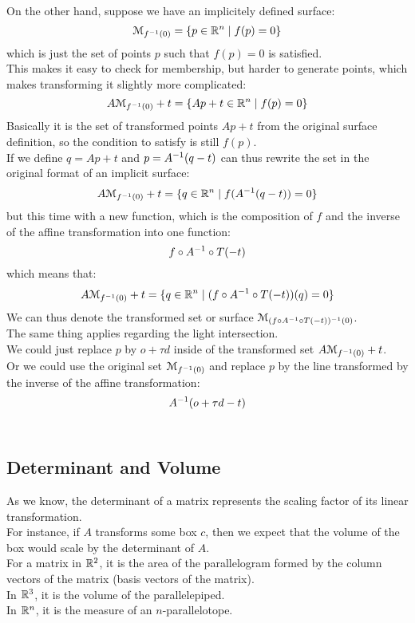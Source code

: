 \documentclass[12pt]{article}
\begin{document}
On the other hand, suppose we have an implicitely
defined surface:
\[ \mathcal{M}_{f^{-1}(0)}
= \{ p \in \mathbb{R}^n \mid f(p) =0 \} \]
which is just the set of points $p$
such that $f(p) = 0$ is satisfied. \\
This makes it easy to check for membership,
but harder to generate points,
which makes transforming it slightly more
complicated:
\[ A\mathcal{M}_{f^{-1}(0)} + t
= \{ Ap + t \in \mathbb{R}^n \mid f(p) =0 \} \]
Basically it is the set of transformed points 
$Ap + t$ from the original surface definition,
so the condition to satisfy is still $f(p)$. \\
If we define $q = Ap + t$
and $p = A^{-1}(q - t)$ can thus rewrite
the set in the original format of
an implicit surface:
\[ A\mathcal{M}_{f^{-1}(0)} + t
= \{ q \in \mathbb{R}^n \mid f(A^{-1}(q - t)) = 0 \} \]
but this time with a new function,
which is the composition of $f$ and the inverse of the
affine transformation into one function:
\[ f \circ A^{-1} \circ T(-t) \]
which means that:
\[ A\mathcal{M}_{f^{-1}(0)} + t
= \{ q \in \mathbb{R}^n \mid 
(f \circ A^{-1} \circ T(-t))(q) = 0 \} \]
We can thus denote the transformed set or surface
$\mathcal{M}_{(f \circ A^{-1} \circ T(-t))^{-1}(0)}$. \\

The same thing applies regarding the
light intersection. \\
We could just replace $p$
by $o + \tau d$
inside of the transformed set 
$A\mathcal{M}_{f^{-1}(0)} + t$. \\
Or we could use the original set
$\mathcal{M}_{f^{-1}(0)}$
and replace $p$
by the line transformed by the inverse of
the affine transformation:
\[A^{-1}(o + \tau d - t)\] \\

\newpage

\subsection*{Determinant and Volume}

As we know, the determinant of a matrix represents
the scaling factor of its linear transformation. \\
For instance, if $A$ transforms
some box $c$,
then we expect that the volume of the box
would scale by the determinant of $A$. \\

For a matrix in $\mathbb{R}^2$,
it is the area of the parallelogram formed
by the column vectors of the matrix (basis vectors
of the matrix). \\
In $\mathbb{R}^3$, it is the volume of the parallelepiped. \\
In $\mathbb{R}^n$, it is the measure of an $n$-parallelotope. \\
\end{document}
